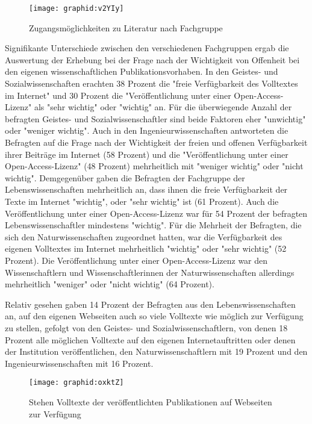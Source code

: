 \begin{figure}[h!]
\texttt{[image: graphid:v2YIy]}
\caption{Zugangsmöglichkeiten zu Literatur nach Fachgruppe}
\end{figure}

Signifikante Unterschiede zwischen den verschiedenen Fachgruppen ergab die Auswertung der Erhebung bei der Frage nach der Wichtigkeit von Offenheit bei den eigenen wissenschaftlichen Publikationsvorhaben. In den Geistes- und Sozialwissenschaften erachten 38 Prozent die "freie Verfügbarkeit des Volltextes im Internet" und 30 Prozent die "Veröffentlichung unter einer Open-Access-Lizenz" als "sehr wichtig" oder "wichtig" an. Für die überwiegende Anzahl der befragten Geistes- und Sozialwissenschaftler sind beide Faktoren eher "unwichtig" oder "weniger wichtig". Auch in den Ingenieurwissenschaften antworteten die Befragten auf die Frage nach der Wichtigkeit der freien und offenen Verfügbarkeit ihrer Beiträge im Internet (58 Prozent) und die "Veröffentlichung unter einer Open-Access-Lizenz" (48 Prozent) mehrheitlich mit "weniger wichtig" oder "nicht wichtig". Demgegenüber gaben die Befragten der Fachgruppe der Lebenswissenschaften mehrheitlich an, dass ihnen die freie Verfügbarkeit der Texte im Internet "wichtig", oder "sehr wichtig" ist (61 Prozent). Auch die Veröffentlichung unter einer Open-Access-Lizenz war für 54 Prozent der befragten Lebenswissenschaftler mindestens "wichtig". Für die Mehrheit der Befragten, die sich den Naturwissenschaften zugeordnet hatten, war die Verfügbarkeit des eigenen Volltextes im Internet mehrheitlich "wichtig" oder "sehr wichtig" (52 Prozent). Die Veröffentlichung unter einer Open-Access-Lizenz war den Wissenschaftlern und Wissenschaftlerinnen der Naturwissenschaften allerdings mehrheitlich "weniger" oder "nicht wichtig" (64 Prozent).

Relativ gesehen gaben 14 Prozent der Befragten aus den Lebenswissenschaften an, auf den eigenen Webseiten auch so viele Volltexte wie möglich zur Verfügung zu stellen, gefolgt von den Geistes- und Sozialwissenschaftlern, von denen 18 Prozent alle möglichen Volltexte auf den eigenen Internetauftritten oder denen der Institution veröffentlichen, den Naturwissenschaftlern mit 19 Prozent und den Ingenieurwissenschaften mit 16 Prozent.

\begin{figure}[h!]
\texttt{[image: graphid:oxktZ]}
\caption{Stehen Volltexte der veröffentlichten Publikationen auf Webseiten zur Verfügung}
\end{figure}

